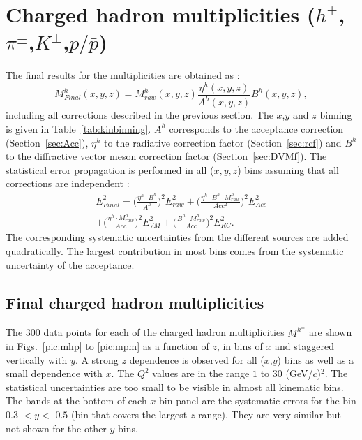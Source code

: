 
\section{Charged hadron multiplicities ($h^{\pm}$,$\pi^{\pm}$,$K^{\pm}$,$p/\bar{p}$)}

The final results for the multiplicities are obtained as :
%
\begin{equation}
  	M^h_{Final}(x,y,z) = M^h_{raw}(x,y,z)\frac{\eta^h(x,y,z)}{A^h(x,y,z)}B^h(x,y,z),
\end{equation}
%
including all corrections described in the previous section.
The $x$,$y$ and $z$ binning is given in Table~\ref{tab:kinbinning}. $A^h$ corresponds to the acceptance correction (Section~\ref{sec:Acc}), $\eta^h$ to the radiative correction factor (Section~\ref{sec:rcf}) and $B^h$ to the diffractive vector meson correction factor (Section~\ref{sec:DVMf}). The statistical error propagation is performed in all ($x,y,z$) bins assuming that all corrections are independent :
%
\begin{equation}
\begin{split}
		E^2_{Final} = \bigg( \frac{\eta^h \cdot B^h}{A^h} \bigg)^2 E^2_{raw} + \bigg(\frac{\eta^h \cdot B^h \cdot M^h_{raw}}{Acc^2} \bigg)^2 E^2_{Acc} \\
		+ \bigg(\frac{\eta^h \cdot M^h_{raw}}{Acc} \bigg)^2 E^2_{VM} + \bigg(\frac{B^h \cdot M^h_{raw}}{Acc} \bigg)^2 E^2_{RC}.
\end{split}
\end{equation}
%
The corresponding systematic uncertainties from the different sources are added quadratically. The largest contribution in most bins comes from the systematic uncertainty of the acceptance.

\subsection{Final charged hadron multiplicities}

The 300 data points for each of the charged hadron multiplicities $M^{h^{\pm}}$ are shown in Figs.~\ref{pic:mhp} to \ref{pic:mpm} as a function of $z$, in bins of $x$ and staggered vertically with $y$. A strong $z$ dependence is observed for all ($x$,$y$) bins as well as a small dependence with $x$. The $Q^2$ values are in the range $1$ to $30$ (GeV/$c$)$^2$. The statistical uncertainties are too small to be visible in almost all kinematic bins. The bands at the bottom of each $x$ bin panel are the systematic errors for the bin $0.3$ $< y <$ $0.5$ (bin that covers the largest $z$ range). They are very similar but not shown for the other $y$ bins.

